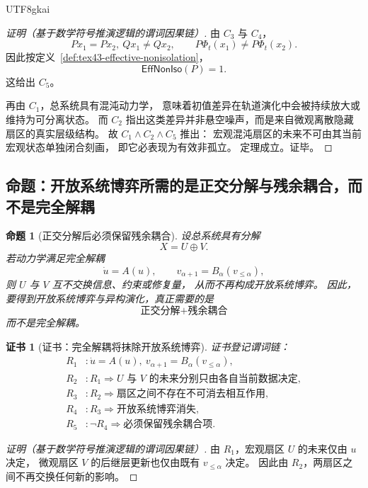\documentclass[12pt]{article}
\newtheorem{proposition}{命题}[section]
\newtheorem{Certificate}{证书}[section]
\begin{document}
\begin{CJK*}{UTF8}{gkai}
\begin{proof}[证明（基于数学符号推演逻辑的谓词因果链）]
由 $C_3$ 与 $C_4$，
\[
  Px_1=Px_2,\ Qx_1\neq Qx_2,
  \qquad
  P\Phi_t(x_1)\neq P\Phi_t(x_2).
\]
因此按定义~\ref{def:tex43-effective-nonisolation}，
\[
  \mathsf{EffNonIso}(P)=1.
\]
这给出 $C_5$。

再由 $C_1$，总系统具有混沌动力学，
意味着初值差异在轨道演化中会被持续放大或维持为可分离状态。
而 $C_2$ 指出这类差异并非悬空噪声，而是来自微观离散隐藏扇区的真实层级结构。
故 $C_1\wedge C_2\wedge C_5$ 推出：
宏观混沌扇区的未来不可由其当前宏观状态单独闭合刻画，
即它必表现为有效非孤立。
定理成立。证毕。
\end{proof}

\subsection{命题：开放系统博弈所需的是正交分解与残余耦合，而不是完全解耦}
\label{subsec:tex43-ch5-proposition-coupling}

\begin{proposition}[正交分解后必须保留残余耦合]
\label{prop:tex43-residual-coupling}
设总系统具有分解
\[
  X=U\oplus V.
\]
若动力学满足完全解耦
\[
  \dot u=A(u),
  \qquad
  v_{\alpha+1}=B_\alpha(v_{\le\alpha}),
\]
则 $U$ 与 $V$ 互不交换信息、约束或修复量，
从而不再构成开放系统博弈。
因此，要得到开放系统博弈与异构演化，真正需要的是
\[
  \boxed{\text{正交分解}+\text{残余耦合}}
\]
而不是完全解耦。
\end{proposition}

\begin{Certificate}[证书：完全解耦将抹除开放系统博弈]
\label{cert:tex43-residual-coupling}
证书登记谓词链：
\[
\begin{aligned}
  R_1 &: \dot u=A(u),\ v_{\alpha+1}=B_\alpha(v_{\le\alpha}),\\
  R_2 &: R_1 \Rightarrow U\text{ 与 }V\text{ 的未来分别只由各自当前数据决定},\\
  R_3 &: R_2 \Rightarrow \text{扇区之间不存在不可消去相互作用},\\
  R_4 &: R_3 \Rightarrow \text{开放系统博弈消失},\\
  R_5 &: \neg R_4 \Rightarrow \text{必须保留残余耦合项}.
\end{aligned}
\]
\end{Certificate}

\begin{proof}[证明（基于数学符号推演逻辑的谓词因果链）]
由 $R_1$，宏观扇区 $U$ 的未来仅由 $u$ 决定，
微观扇区 $V$ 的后继层更新也仅由既有 $v_{\le\alpha}$ 决定。
因此由 $R_2$，两扇区之间不再交换任何新的影响。


\end{proof}
\end{CJK*}
\end{document}

